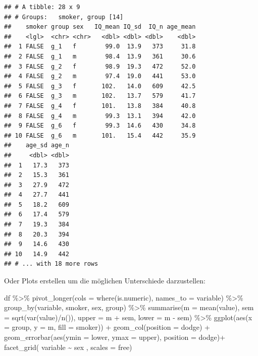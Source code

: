 \documentclass[
]{book}
\newenvironment{Shaded}{\begin{snugshade}}{\end{snugshade}}
\newcommand{\AttributeTok}[1]{\textcolor[rgb]{0.77,0.63,0.00}{#1}}
\newcommand{\FunctionTok}[1]{\textcolor[rgb]{0.00,0.00,0.00}{#1}}
\newcommand{\NormalTok}[1]{#1}
\newcommand{\SpecialCharTok}[1]{\textcolor[rgb]{0.00,0.00,0.00}{#1}}
\newcommand{\StringTok}[1]{\textcolor[rgb]{0.31,0.60,0.02}{#1}}
\begin{document}
\begin{verbatim}
## # A tibble: 28 x 9
## # Groups:   smoker, group [14]
##    smoker group sex   IQ_mean IQ_sd  IQ_n age_mean
##    <lgl>  <chr> <chr>   <dbl> <dbl> <dbl>    <dbl>
##  1 FALSE  g_1   f        99.0  13.9   373     31.8
##  2 FALSE  g_1   m        98.4  13.9   361     30.6
##  3 FALSE  g_2   f        98.9  19.3   472     52.0
##  4 FALSE  g_2   m        97.4  19.0   441     53.0
##  5 FALSE  g_3   f       102.   14.0   609     42.5
##  6 FALSE  g_3   m       102.   13.7   579     41.7
##  7 FALSE  g_4   f       101.   13.8   384     40.8
##  8 FALSE  g_4   m        99.3  13.1   394     42.0
##  9 FALSE  g_6   f        99.3  14.6   430     34.8
## 10 FALSE  g_6   m       101.   15.4   442     35.9
##    age_sd age_n
##     <dbl> <dbl>
##  1   17.3   373
##  2   15.3   361
##  3   27.9   472
##  4   27.7   441
##  5   18.2   609
##  6   17.4   579
##  7   19.3   384
##  8   20.3   394
##  9   14.6   430
## 10   14.9   442
## # ... with 18 more rows
\end{verbatim}

Oder Plots erstellen um die möglichen Unterschiede darzustellen:

\begin{Shaded}
\begin{Highlighting}[]
\NormalTok{df }\SpecialCharTok{\%\textgreater{}\%} 
  \FunctionTok{pivot\_longer}\NormalTok{(}\AttributeTok{cols =} \FunctionTok{where}\NormalTok{(is.numeric),}
               \AttributeTok{names\_to =} \StringTok{\textquotesingle{}variable\textquotesingle{}}\NormalTok{) }\SpecialCharTok{\%\textgreater{}\%} 
  \FunctionTok{group\_by}\NormalTok{(variable, smoker, sex, group) }\SpecialCharTok{\%\textgreater{}\%} 
  \FunctionTok{summarise}\NormalTok{(}\AttributeTok{m =} \FunctionTok{mean}\NormalTok{(value),}
            \AttributeTok{sem =} \FunctionTok{sqrt}\NormalTok{(}\FunctionTok{var}\NormalTok{(value)}\SpecialCharTok{/}\FunctionTok{n}\NormalTok{()),}
            \AttributeTok{upper =}\NormalTok{ m }\SpecialCharTok{+}\NormalTok{ sem,}
            \AttributeTok{lower =}\NormalTok{ m }\SpecialCharTok{{-}}\NormalTok{ sem) }\SpecialCharTok{\%\textgreater{}\%} 
  \FunctionTok{ggplot}\NormalTok{(}\FunctionTok{aes}\NormalTok{(}\AttributeTok{x =}\NormalTok{ group,}
             \AttributeTok{y =}\NormalTok{ m,}
             \AttributeTok{fill =}\NormalTok{ smoker)) }\SpecialCharTok{+}
  \FunctionTok{geom\_col}\NormalTok{(}\AttributeTok{position =} \StringTok{\textquotesingle{}dodge\textquotesingle{}}\NormalTok{) }\SpecialCharTok{+}
  \FunctionTok{geom\_errorbar}\NormalTok{(}\FunctionTok{aes}\NormalTok{(}\AttributeTok{ymin =}\NormalTok{ lower,}
                    \AttributeTok{ymax =}\NormalTok{ upper),}
                \AttributeTok{position =} \StringTok{\textquotesingle{}dodge\textquotesingle{}}\NormalTok{)}\SpecialCharTok{+}
  \FunctionTok{facet\_grid}\NormalTok{( variable }\SpecialCharTok{\textasciitilde{}}\NormalTok{ sex , }\AttributeTok{scales =} \StringTok{\textquotesingle{}free\textquotesingle{}}\NormalTok{)}
\end{Highlighting}
\end{Shaded}
\end{document}
